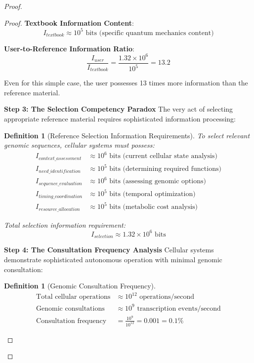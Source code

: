 \documentclass[12pt,a4paper]{article}
\newtheorem{definition}[theorem]{Definition}
\begin{document}
\begin{proof}
\begin{proof}
\textbf{Textbook Information Content}:
\begin{equation}
I_{textbook} \approx 10^5 \text{ bits (specific quantum mechanics content)}
\end{equation}

\textbf{User-to-Reference Information Ratio}:
\begin{equation}
\frac{I_{user}}{I_{textbook}} = \frac{1.32 \times 10^6}{10^5} = 13.2
\end{equation}

Even for this simple case, the user possesses 13 times more information than the reference material.

\textbf{Step 3: The Selection Competency Paradox}
The very act of selecting appropriate reference material requires sophisticated information processing:

\begin{definition}[Reference Selection Information Requirements]
To select relevant genomic sequences, cellular systems must possess:
\begin{align}
I_{context\_assessment} &\approx 10^6 \text{ bits (current cellular state analysis)} \\
I_{need\_identification} &\approx 10^5 \text{ bits (determining required functions)} \\
I_{sequence\_evaluation} &\approx 10^6 \text{ bits (assessing genomic options)} \\
I_{timing\_coordination} &\approx 10^5 \text{ bits (temporal optimization)} \\
I_{resource\_allocation} &\approx 10^5 \text{ bits (metabolic cost analysis)}
\end{align}

Total selection information requirement:
\begin{equation}
I_{selection} \approx 1.32 \times 10^6 \text{ bits}
\end{equation}
\end{definition}

\textbf{Step 4: The Consultation Frequency Analysis}
Cellular systems demonstrate sophisticated autonomous operation with minimal genomic consultation:

\begin{definition}[Genomic Consultation Frequency]
\begin{align}
\text{Total cellular operations} &\approx 10^{12} \text{ operations/second} \\
\text{Genomic consultations} &\approx 10^9 \text{ transcription events/second} \\
\text{Consultation frequency} &= \frac{10^9}{10^{12}} = 0.001 = 0.1\%
\end{align}
\end{definition}


\end{proof}
\end{proof}
\end{document}
